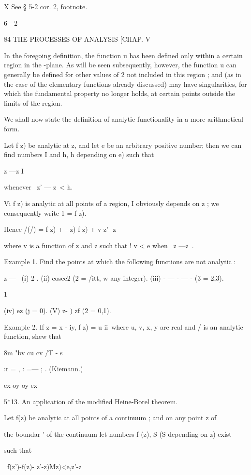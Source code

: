 X See § 5-2 cor. 2, footnote.

6—2



84 THE PROCESSES OF ANALYSIS [CHAP. V

In the foregoing definition, the function u has been defined only
within a certain region in the -plane. As will be seen subsequently,
however, the function u can generally be defined for other values of 2
not included in this region ; and (as in the case of the elementary
functions already discussed) may have singularities, for which the
fundamental property no longer holds, at certain points outside the
limits of the region.

We shall now state the definition of analytic functionality in a more
arithmetical form.

Let f z) be analytic at z, and let e be an arbitrary positive number;
then we can find numbers I and h, h depending on e) such that

z —z I

whenever \ z' — z\ < h.

Vi f z) is analytic at all points of a region, I obviously depends on
z ; we consequently write 1 = f z).

Hence /(/) = f z) + - z) f z) + v z'- z\

where v is a function of z and z such that ! v < e when \ z —z\ < t>.

Example 1. Find the points at which the following functions are not
analytic :

z — \ (i) 2 . (ii) cosec2 (2 = /itt, w any integer). (iii) - — - — -
(3 = 2,3).

1

(iv) ez (j = 0). (V) z- ) zf (2 = 0,1).

Example 2. If z = x - iy, f z) = u ii\ where u, v, x, y are real and /
is an analytic function, shew that

8m "bv cu cv /T - s

 :r = , : =— ; . (Kiemann.)

ex oy oy ex

5*13. An application of the modified Heine-Borel theorem.

Let f(z) be analytic at all points of a continuum ; and on any point z
of

the boundar ' of the continuum let numbers f (z), S (S depending on z)
exist

such that

\ f(z')-f(z)- z'-z)Mz)<e,z'-z\

